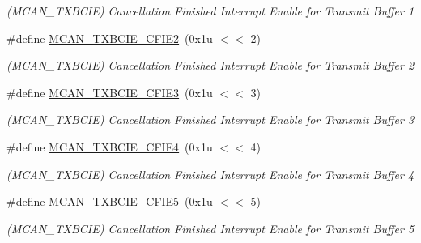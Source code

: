 \begin{DoxyCompactItemize}
\begin{DoxyCompactList}\small\item\em (M\+C\+A\+N\+\_\+\+T\+X\+B\+C\+IE) Cancellation Finished Interrupt Enable for Transmit Buffer 1 \end{DoxyCompactList}\item 
\mbox{\label{group__SAMV71__MCAN_ga66df614ddb90be2bf32bddd92587b7c8}} 
\#define \mbox{\hyperlink{group__SAMV71__MCAN_ga66df614ddb90be2bf32bddd92587b7c8}{M\+C\+A\+N\+\_\+\+T\+X\+B\+C\+I\+E\+\_\+\+C\+F\+I\+E2}}~(0x1u $<$$<$ 2)
\begin{DoxyCompactList}\small\item\em (M\+C\+A\+N\+\_\+\+T\+X\+B\+C\+IE) Cancellation Finished Interrupt Enable for Transmit Buffer 2 \end{DoxyCompactList}\item 
\mbox{\label{group__SAMV71__MCAN_ga55a97192dce2ee492125e833cc036ac7}} 
\#define \mbox{\hyperlink{group__SAMV71__MCAN_ga55a97192dce2ee492125e833cc036ac7}{M\+C\+A\+N\+\_\+\+T\+X\+B\+C\+I\+E\+\_\+\+C\+F\+I\+E3}}~(0x1u $<$$<$ 3)
\begin{DoxyCompactList}\small\item\em (M\+C\+A\+N\+\_\+\+T\+X\+B\+C\+IE) Cancellation Finished Interrupt Enable for Transmit Buffer 3 \end{DoxyCompactList}\item 
\mbox{\label{group__SAMV71__MCAN_ga45316c744dad11d5d4ec8505391db407}} 
\#define \mbox{\hyperlink{group__SAMV71__MCAN_ga45316c744dad11d5d4ec8505391db407}{M\+C\+A\+N\+\_\+\+T\+X\+B\+C\+I\+E\+\_\+\+C\+F\+I\+E4}}~(0x1u $<$$<$ 4)
\begin{DoxyCompactList}\small\item\em (M\+C\+A\+N\+\_\+\+T\+X\+B\+C\+IE) Cancellation Finished Interrupt Enable for Transmit Buffer 4 \end{DoxyCompactList}\item 
\mbox{\label{group__SAMV71__MCAN_ga4d2eb8d294051ee08b2d722583685c5a}} 
\#define \mbox{\hyperlink{group__SAMV71__MCAN_ga4d2eb8d294051ee08b2d722583685c5a}{M\+C\+A\+N\+\_\+\+T\+X\+B\+C\+I\+E\+\_\+\+C\+F\+I\+E5}}~(0x1u $<$$<$ 5)
\begin{DoxyCompactList}\small\item\em (M\+C\+A\+N\+\_\+\+T\+X\+B\+C\+IE) Cancellation Finished Interrupt Enable for Transmit Buffer 5 \end{DoxyCompactList}\item 

\end{DoxyCompactItemize}
